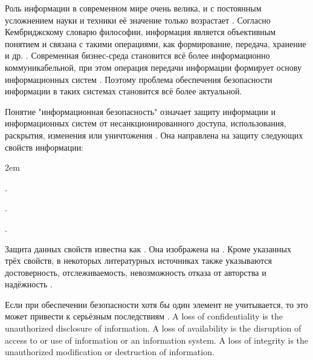 \Sentence
Роль информации в современном мире очень велика, и с постоянным усложнением науки и техники её 
значение только возрастает .
\Sentence
Согласно Кембриджскому словарю философии, информация является объективным понятием и связана с 
такими операциями, как формирование, передача, хранение и др. .
\Sentence
Современная бизнес-среда становится всё более информационно коммуникабельной, при этом операция 
передачи информации формирует основу информационных систем . 
\Sentence
Поэтому проблема обеспечения безопасности информации в таких системах становится всё более 
актуальной.

\Sentence
Понятие "информационная безопасность" означает защиту информации и информационных систем от 
несанкционированного доступа, использования, раскрытия, изменения или уничтожения 
. 
\Sentence
Она направлена на защиту следующих свойств информации:
\begin{description}
	\leftskip2em%
	\setlength{\itemsep}{0pt}%
	\setlength{\parsep}{0pt}%

	\item[Целостность] .
	\item[Конфиденциальность] .
	\item[Доступность] .
\end{description}

\Sentence
Защита данных свойств известна как \Emphasis{\CIATriad}.
\Sentence
Она изображена на . 
\Sentence
Кроме указанных трёх свойств, в некоторых литературных источниках также указываются достоверность, 
отслеживаемость, невозможность отказа от авторства и надёжность . 


\Sentence
Если при обеспечении безопасности хотя бы один элемент \CIATriad не учитывается, то это может 
привести к серьёзным последствиям .
\Sentence
A loss of confidentiality is the unauthorized disclosure of information.
\Sentence
A loss of availability is the disruption of access to or use of information or an information 
system.
\Sentence
A loss of integrity is the unauthorized modification or destruction of information.

